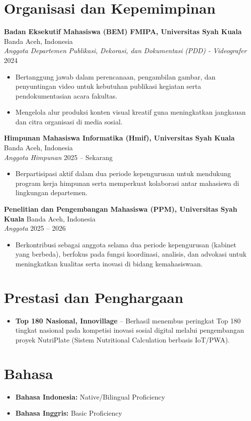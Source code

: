 \documentclass[11pt,a4paper]{article}
\begin{document}
\section*{Organisasi dan Kepemimpinan}

\textbf{Badan Eksekutif Mahasiswa (BEM) FMIPA, Universitas Syah Kuala} \hfill Banda Aceh, Indonesia \\
\textit{Anggota Departemen Publikasi, Dekorasi, dan Dokumentasi (PDD) - Videografer} \hfill 2024
\begin{itemize}[leftmargin=0.25in]
    \item Bertanggung jawab dalam perencanaan, pengambilan gambar, dan penyuntingan video untuk kebutuhan publikasi kegiatan serta pendokumentasian acara fakultas.
    \item Mengelola alur produksi konten visual kreatif guna meningkatkan jangkauan dan citra organisasi di media sosial.
\end{itemize}

\textbf{Himpunan Mahasiswa Informatika (Hmif), Universitas Syah Kuala} \hfill Banda Aceh, Indonesia \\
\textit{Anggota Himpunan} \hfill 2025 -- Sekarang
\begin{itemize}[leftmargin=0.25in]
    \item Berpartisipasi aktif dalam dua periode kepengurusan untuk mendukung program kerja himpunan serta memperkuat kolaborasi antar mahasiswa di lingkungan departemen.
\end{itemize}

\textbf{Penelitian dan Pengembangan Mahasiswa (PPM), Universitas Syah Kuala} \hfill Banda Aceh, Indonesia \\
\textit{Anggota} \hfill 2025 -- 2026
\begin{itemize}[leftmargin=0.25in]
    \item Berkontribusi sebagai anggota selama dua periode kepengurusan (kabinet yang berbeda), berfokus pada fungsi koordinasi, analisis, dan advokasi untuk meningkatkan kualitas serta inovasi di bidang kemahasiswaan.
\end{itemize}

\section*{Prestasi dan Penghargaan}
\begin{itemize}[leftmargin=0.25in]
    \item \textbf{Top 180 Nasional, Innovillage} -- Berhasil menembus peringkat Top 180 tingkat nasional pada kompetisi inovasi sosial digital melalui pengembangan proyek NutriPlate (Sistem Nutritional Calculation berbasis IoT/PWA).
\end{itemize}

\section*{Bahasa}
\begin{itemize}[leftmargin=0.25in]
    \item \textbf{Bahasa Indonesia:} Native/Bilingual Proficiency
    \item \textbf{Bahasa Inggris:} Basic Proficiency
\end{itemize}
\end{document}

